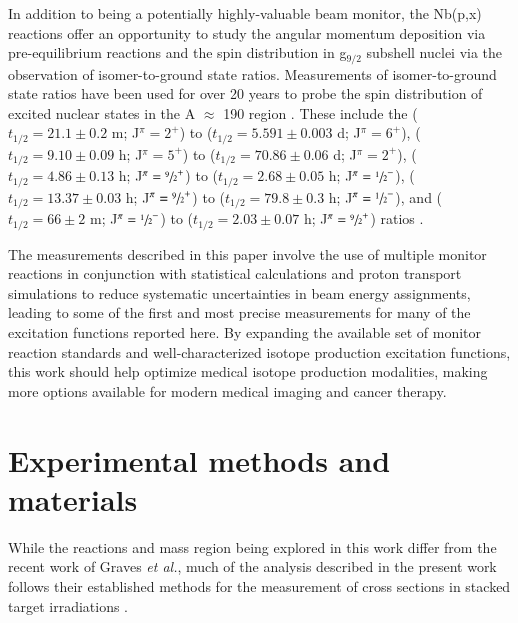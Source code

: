 \documentclass[3p]{elsarticle}
\newcommand{\etal}{\emph{et al.}}
\begin{document}
  
In addition to being a potentially highly-valuable beam monitor, the Nb(p,x) reactions offer an opportunity to study the angular momentum deposition via pre-equilibrium reactions and the spin distribution in g$_{9/2}$ subshell nuclei via the observation of isomer-to-ground state ratios.  
Measurements of isomer-to-ground state ratios have been used for over 20 years to probe the spin distribution of excited nuclear states in the A $\approx$ 190 region \cite{PhysRevC.73.034613,PhysRevC.45.1171}.
These include the  ($t_{1/2}=21.1\pm0.2$ m; J$^\pi=2^+$) to   ($t_{1/2}=5.591\pm0.003$ d; J$^\pi=6^+$),  ($t_{1/2}=9.10\pm0.09$ h; J$^\pi=5^+$) to   ($t_{1/2}=70.86\pm0.06$ d; J$^\pi=2^+$),   ($t_{1/2}=4.86\pm0.13$ h; J$^\pi=\sfrac{9}{2}^+$) to   ($t_{1/2}=2.68\pm0.05$ h; J$^\pi=\sfrac{1}{2}^-$),   ($t_{1/2}=13.37\pm0.03$ h; J$^\pi=\sfrac{9}{2}^+$) to   ($t_{1/2}=79.8\pm0.3$ h; J$^\pi=\sfrac{1}{2}^-$),  and  ($t_{1/2}=66\pm2$ m; J$^\pi=\sfrac{1}{2}^-$) to   ($t_{1/2}=2.03\pm0.07$ h; J$^\pi=\sfrac{9}{2}^+$)  ratios \cite{Dong2015,Nesaraja2010,Singh2014,Johnson2015,Singh2013}.  
 
 
The measurements described in this paper involve the use of multiple monitor reactions in conjunction with statistical calculations and proton transport simulations to reduce systematic uncertainties in beam energy assignments, leading to some of the first and most precise measurements  for many of the excitation functions reported here. 
By expanding the available set of monitor reaction standards and well-characterized isotope production excitation functions, this work should help optimize medical isotope production modalities, making more options   available for modern medical imaging and cancer therapy.

 
 
 


\section{Experimental methods and materials}\label{sec:experiment}


While the reactions and mass region being explored in this work differ from the recent work of Graves \etal, much of the analysis described in the present work follows their established methods for the measurement of cross sections in stacked target irradiations   \cite{Graves2016}.
\end{document}
